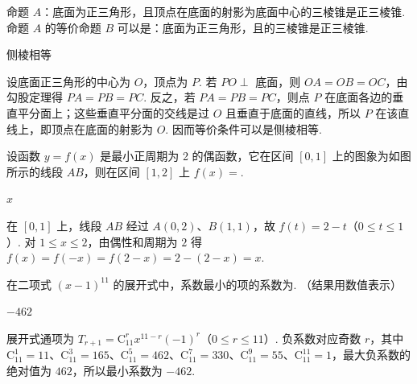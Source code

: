 \begin{problem}
命题 \(A\)：底面为正三角形，且顶点在底面的射影为底面中心的三棱锥是正三棱锥. 命题 \(A\) 的等价命题 \(B\) 可以是：底面为正三角形，且\fillinblank{}的三棱锥是正三棱锥.
\end{problem}

\begin{answer}
侧棱相等
\end{answer}

\begin{solution}
设底面正三角形的中心为 \(O\)，顶点为 \(P\). 若 \(PO\perp\) 底面，则 \(OA=OB=OC\)，由勾股定理得 \(PA=PB=PC\). 反之，若 \(PA=PB=PC\)，则点 \(P\) 在底面各边的垂直平分面上；这些垂直平分面的交线是过 \(O\) 且垂直于底面的直线，所以 \(P\) 在该直线上，即顶点在底面的射影为 \(O\). 因而等价条件可以是侧棱相等.
\end{solution}

\begin{problem}
设函数 \( y = f(x) \) 是最小正周期为 2 的偶函数，它在区间 \([0,1]\) 上的图象为如图所示的线段 \(AB\)，则在区间 \([1,2]\) 上 \( f(x) = \)\fillinblank{}.

\end{problem}

\begin{answer}
\(x\)
\end{answer}

\begin{solution}
在 \([0,1]\) 上，线段 \(AB\) 经过 \(A(0,2)\)、\(B(1,1)\)，故 \(f(t)=2-t\)（\(0\leqslant t\leqslant1\)）. 对 \(1\leqslant x\leqslant2\)，由偶性和周期为 \(2\) 得 \(f(x)=f(-x)=f(2-x)=2-(2-x)=x\).
\end{solution}

\begin{problem}
在二项式 \((x - 1)^{11}\) 的展开式中，系数最小的项的系数为\fillinblank{}. （结果用数值表示）
\end{problem}

\begin{answer}
\(-462\)
\end{answer}

\begin{solution}
展开式通项为 \(T_{r+1}=\mathrm C_{11}^{r}x^{11-r}(-1)^r\)（\(0\leqslant r\leqslant11\)）. 负系数对应奇数 \(r\)，其中 \(\mathrm C_{11}^{1}=11\)、\(\mathrm C_{11}^{3}=165\)、\(\mathrm C_{11}^{5}=462\)、\(\mathrm C_{11}^{7}=330\)、\(\mathrm C_{11}^{9}=55\)、\(\mathrm C_{11}^{11}=1\)，最大负系数的绝对值为 \(462\)，所以最小系数为 \(-462\).
\end{solution}

